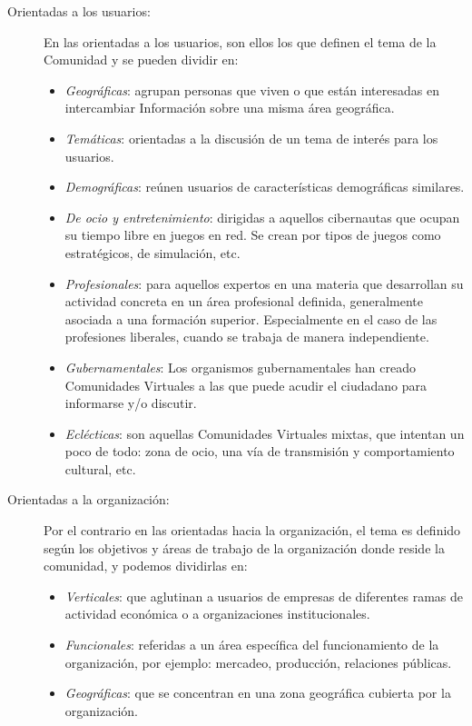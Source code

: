 \begin{description}

\item[Orientadas a los usuarios: ] En las orientadas a los usuarios, son ellos los que definen el tema de la Comunidad y se pueden dividir en:

\begin{itemize}

\item \emph{Geográficas}: agrupan personas que viven o que están interesadas en intercambiar   Información sobre una misma área geográfica.
\item \emph{Temáticas}: orientadas a la discusión de un tema de interés para los usuarios.
\item \emph{Demográficas}: reúnen usuarios de características demográficas similares.
\item \emph{De ocio y entretenimiento}: dirigidas a aquellos cibernautas que ocupan su tiempo libre en juegos en red. Se crean por tipos de juegos como estratégicos, de simulación, etc.
\item \emph{Profesionales}: para aquellos expertos en una materia que desarrollan su actividad concreta en un área profesional definida, generalmente asociada a una formación superior. Especialmente en el caso de las profesiones liberales, cuando se trabaja de manera independiente.
\item \emph{Gubernamentales}: Los organismos gubernamentales han creado Comunidades Virtuales a las que puede acudir el ciudadano para informarse y/o discutir.
\item \emph{Eclécticas}: son aquellas Comunidades Virtuales mixtas, que intentan un poco de todo: zona de ocio, una vía de transmisión y comportamiento cultural, etc.


\end{itemize}

\item [Orientadas a la organización: ]
Por el contrario en las orientadas hacia la organización, el tema es definido según los objetivos y áreas de trabajo de la organización donde reside la comunidad, y podemos dividirlas en:

\begin{itemize}
\item \emph{Verticales}: que aglutinan a usuarios de empresas de diferentes ramas de actividad económica o a organizaciones institucionales.
\item \emph{Funcionales}: referidas a un área específica del funcionamiento de la organización, por ejemplo: mercadeo, producción, relaciones públicas.
\item \emph{Geográficas}: que se concentran en una zona geográfica cubierta por la organización.

\end{itemize}

\end{description}

